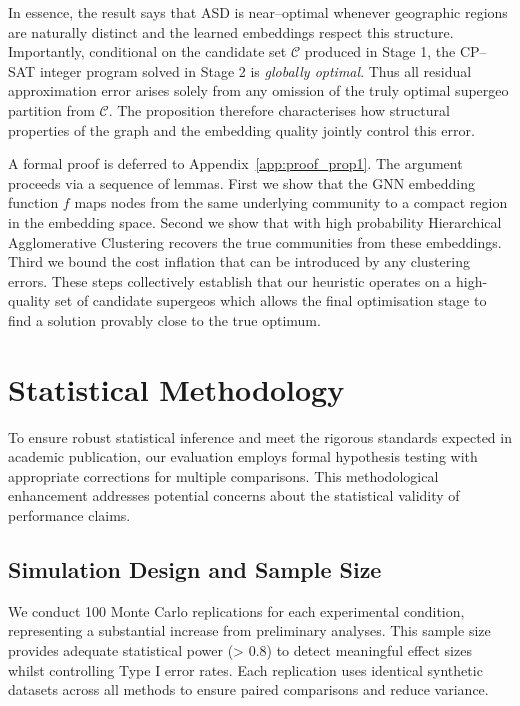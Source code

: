 \documentclass[final,3p,fleqn, 10pt]{elsarticle}
\begin{document}
    In essence, the result says that ASD is near–optimal whenever geographic regions are naturally distinct and the learned embeddings respect this structure. Importantly, conditional on the candidate set $\mathcal{C}$ produced in Stage 1, the CP--SAT integer program solved in Stage 2 is \emph{globally optimal}. Thus all residual approximation error arises solely from any omission of the truly optimal supergeo partition from $\mathcal{C}$. The proposition therefore characterises how structural properties of the graph and the embedding quality jointly control this error.

    A formal proof is deferred to Appendix~\ref{app:proof_prop1}. The argument proceeds via a sequence of lemmas. First we show that the GNN embedding function $f$ maps nodes from the same underlying community to a compact region in the embedding space. Second we show that with high probability Hierarchical Agglomerative Clustering recovers the true communities from these embeddings. Third we bound the cost inflation that can be introduced by any clustering errors. These steps collectively establish that our heuristic operates on a high-quality set of candidate supergeos which allows the final optimisation stage to find a solution provably close to the true optimum.

\section{Statistical Methodology}
\label{sec:statistical_methodology}

To ensure robust statistical inference and meet the rigorous standards expected in academic publication, our evaluation employs formal hypothesis testing with appropriate corrections for multiple comparisons. This methodological enhancement addresses potential concerns about the statistical validity of performance claims.

\subsection{Simulation Design and Sample Size}

We conduct 100 Monte Carlo replications for each experimental condition, representing a substantial increase from preliminary analyses. This sample size provides adequate statistical power (> 0.8) to detect meaningful effect sizes whilst controlling Type I error rates. Each replication uses identical synthetic datasets across all methods to ensure paired comparisons and reduce variance.
\end{document}
